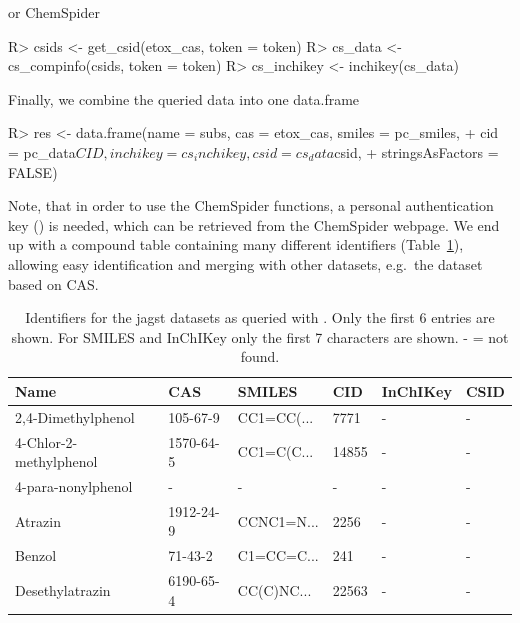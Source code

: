 \documentclass[article, shortnames]{jss}\usepackage[]{graphicx}\usepackage[]{color}
\begin{document}
or ChemSpider
\begin{CodeChunk}
\begin{CodeInput}
R> csids <- get_csid(etox_cas, token = token)
R> cs_data <- cs_compinfo(csids, token = token)
R> cs_inchikey <- inchikey(cs_data)
\end{CodeInput}
\end{CodeChunk}

Finally, we combine the queried data into one data.frame
\begin{CodeChunk}
\begin{CodeInput}
R> res <- data.frame(name = subs, cas = etox_cas, smiles = pc_smiles, 
+    cid = pc_data$CID, inchikey = cs_inchikey, csid = cs_data$csid, 
+    stringsAsFactors = FALSE)
\end{CodeInput}
\end{CodeChunk}

Note, that in order to use the ChemSpider functions, a personal authentication key () is needed, which can be retrieved from the ChemSpider webpage. 
We end up with a compound table containing many different identifiers (Table~\ref{tab:comptable}), allowing easy identification and merging with other datasets, e.g.\ the  dataset based on CAS.

\begin{table}[ht]
\centering
\begin{CodeChunk}
\begin{tabular}{llllll}
  \toprule
Name & CAS & SMILES & CID & InChIKey & CSID \\ 
  \midrule
2,4-Dimethylphenol & 105-67-9 & CC1=CC(... & 7771 & - & - \\ 
  4-Chlor-2-methylphenol & 1570-64-5 & CC1=C(C... & 14855 & - & - \\ 
  4-para-nonylphenol & - & - & - & - & - \\ 
  Atrazin & 1912-24-9 & CCNC1=N... & 2256 & - & - \\ 
  Benzol & 71-43-2 & C1=CC=C... & 241 & - & - \\ 
  Desethylatrazin & 6190-65-4 & CC(C)NC... & 22563 & - & - \\ 
   \bottomrule
\end{tabular}
\end{CodeChunk}
\caption{Identifiers for the jagst datasets as queried with . Only the first 6 entries are shown. For SMILES and InChIKey only the first 7 characters are shown. - = not found.}
\label{tab:comptable}
\end{table}
\end{document}
